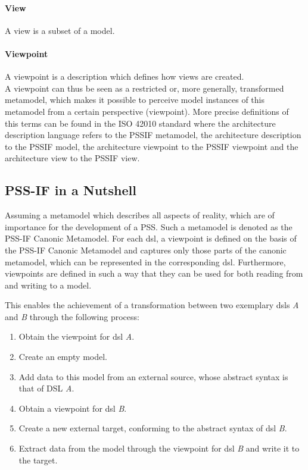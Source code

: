 \paragraph{View} A view is a subset of a model.

\paragraph{Viewpoint} A viewpoint is a description which defines how views are created.\\

A viewpoint can thus be seen as a restricted or, more generally, transformed metamodel, which makes it possible to perceive model instances of this metamodel from a certain perspective (viewpoint). More precise definitions of this terms can be found in the ISO 42010 \cite{ref:42010} standard where the architecture description language refers to the \gls{PSSIF} metamodel, the architecture description to the \gls{PSSIF} model, the architecture viewpoint to the \gls{PSSIF} viewpoint and the architecture view to the \gls{PSSIF} view.

\subsection{PSS-IF in a Nutshell}
\label{sec:approach:pssif:nutshell}

Assuming a metamodel which describes all aspects of reality, which are of importance for the development of a \gls{PSS}. Such a metamodel is denoted as the PSS-IF Canonic Metamodel. For each \gls{dsl}, a viewpoint is defined on the basis of the PSS-IF Canonic Metamodel and captures only those parts of the canonic metamodel, which can be represented in the corresponding \gls{dsl}. Furthermore, viewpoints are defined in such a way that they can be used for both reading from and writing to a model.

This enables the achievement of a transformation between two exemplary \glspl{dsl} \textit{A} and \textit{B} through the following process:

\begin{enumerate}
\item Obtain the viewpoint for \gls{dsl} \textit{A}.
\item Create an empty model.
\item Add data to this model from an external source, whose abstract syntax is that of DSL \textit{A}.
\item Obtain a viewpoint for \gls{dsl} \textit{B}.
\item Create a new external target, conforming to the abstract syntax of \gls{dsl} \textit{B}.
\item Extract data from the model through the viewpoint for \gls{dsl} \textit{B} and write it to the target.
\end{enumerate}

